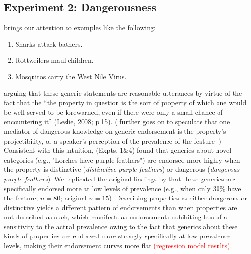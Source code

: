 \documentclass[floatsintext, 11pt, doc]{apa6}
\newcommand{\red}[1]{\textcolor{Red}{#1}}
\begin{document}
\subsection{Experiment 2: Dangerousness}


 brings our attention to examples like the following:

\begin{enumerate}
\item Sharks attack bathers.
\item Rottweilers maul children. 
\item Mosquitos carry the West Nile Virus.
\end{enumerate}

\noindent arguing that these generic statements are reasonable utterances by virtue of the fact that the ``the property in question is the sort of property of which one would be well served to be forewarned, even if there were only a small chance of encountering it'' (Leslie, 2008; p.15).
( further goes on to speculate that one mediator of dangerous knowledge on generic endorsement is the property's projectibility, or a speaker's perception of the prevalence of the feature \cite{Rothbart1978}.)
Consistent with this intuition,   (Expts. 1\&4) found that generics about novel categories (e.g., "Lorches have purple feathers") are endorsed more highly when the property is distinctive (\emph{distinctive purple feathers}) or dangerous (\emph{dangerous purple feathers}).
We replicated the original findings by  that these generics are specifically endorsed more at low levels of prevalence (e.g., when only 30\% have the feature; $n=80$; original $n=15$). 
Describing properties as either dangerous or distinctive yields a different pattern of endorsements than when properties are not described as such, which manifests as endorsements exhibiting less of a sensitivity to the actual prevalence owing to the fact that generics about these kinds of properties are endorsed more strongly specifically at low prevalence levels, making their endorsement curves more flat \red{(regression model results)}. 
\end{document}
